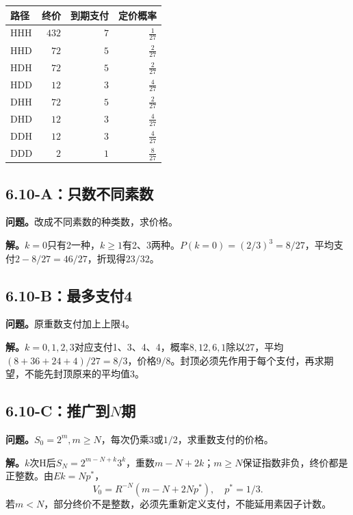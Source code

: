 \documentclass[11pt,a4paper,UTF8,fontset=fandol]{ctexart}
\begin{document}
\begin{longtable}[]{@{}lrrr@{}}
\toprule\noalign{}
路径 & 终价 & 到期支付 & 定价概率 \\
\midrule\noalign{}
\endhead
\bottomrule\noalign{}
\endlastfoot
HHH & \(432\) & \(7\) & \(\frac{1}{27}\) \\
HHD & \(72\) & \(5\) & \(\frac{2}{27}\) \\
HDH & \(72\) & \(5\) & \(\frac{2}{27}\) \\
HDD & \(12\) & \(3\) & \(\frac{4}{27}\) \\
DHH & \(72\) & \(5\) & \(\frac{2}{27}\) \\
DHD & \(12\) & \(3\) & \(\frac{4}{27}\) \\
DDH & \(12\) & \(3\) & \(\frac{4}{27}\) \\
DDD & \(2\) & \(1\) & \(\frac{8}{27}\) \\
\end{longtable}

\endgroup

\subsection{6.10-A：只数不同素数}\label{aux53eaux6570ux4e0dux540cux7d20ux6570}

\textbf{问题。}改成不同素数的种类数，求价格。

\textbf{解。}\(k=0\)只有2一种，\(k\ge1\)有2、3两种。\(P(k=0)=(2/3)^3=8/27\)，平均支付\(2-8/27=46/27\)，折现得\(\boxed{23/32}\)。

\subsection{6.10-B：最多支付4}\label{bux6700ux591aux652fux4ed84}

\textbf{问题。}原重数支付加上上限4。

\textbf{解。}\(k=0,1,2,3\)对应支付1、3、4、4，概率\(8,12,6,1\)除以27，平均\((8+36+24+4)/27=8/3\)，价格\(\boxed{9/8}\)。封顶必须先作用于每个支付，再求期望，不能先封顶原来的平均值3。

\subsection{\texorpdfstring{6.10-C：推广到\(N\)期}{6.10-C：推广到N期}}\label{cux63a8ux5e7fux5230nux671f}

\textbf{问题。}\(S_0=2^m,m\ge N\)，每次仍乘3或\(1/2\)，求重数支付的价格。

\textbf{解。}\(k\)次H后\(S_N=2^{m-N+k}3^k\)，重数\(m-N+2k\)；\(m\ge N\)保证指数非负，终价都是正整数。由\(Ek=Np^*\)，
\[\boxed{V_0=R^{-N}(m-N+2Np^*),\quad p^*=1/3.}\]
若\(m<N\)，部分终价不是整数，必须先重新定义支付，不能延用素因子计数。
\end{document}
